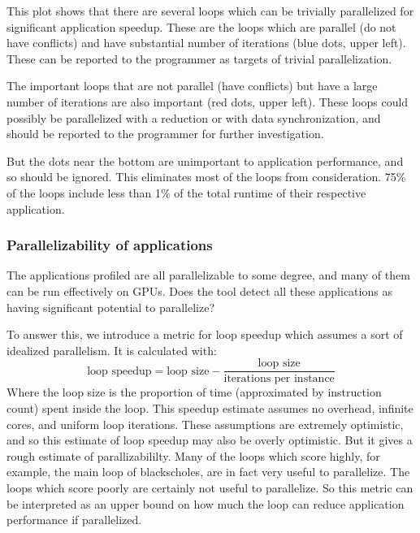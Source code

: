 \documentclass[12pt,twoside]{reedthesis}
\begin{document}
		This plot shows that there are several loops which can be trivially parallelized for significant application speedup. 
		These are the loops which are parallel (do not have conflicts) and have substantial number of iterations (blue dots, upper left). These can be reported to the programmer as targets of trivial parallelization. 
		
		The important loops that are not parallel (have conflicts) but have a large number of iterations are also important (red dots, upper left). These loops could possibly be parallelized with a reduction or with data synchronization, and should be reported to the programmer for further investigation.
		
		But the dots near the bottom are unimportant to application performance, and so should be ignored. This eliminates most of the loops from consideration. 75\% of the loops include less than 1\% of the total runtime of their respective application. 
		
		
		
		\subsubsection{Parallelizability of applications}
		
		The applications profiled are all parallelizable to some degree, and many of them can be run effectively on GPUs. Does the tool detect all these applications as having significant potential to parallelize? 
		
		To answer this, we introduce a metric for loop speedup which assumes a sort of idealized parallelism. It is calculated with:
		$$\text{loop speedup} = \text{loop size} - \frac{\text{loop size}}{\text{iterations per instance}} $$
		Where the loop size is the proportion of time (approximated by instruction count) spent inside the loop.
		This speedup estimate assumes no overhead, infinite cores, and uniform loop iterations.
		These assumptions are extremely optimistic, and so this estimate of loop speedup may also be overly optimistic. But it gives a rough estimate of parallizabililty. Many of the loops which score highly, for example, the main loop of blackscholes, are in fact very useful to parallelize. The loops which score poorly are certainly not useful to parallelize. 
		So this metric can be interpreted as an upper bound on how much the loop can reduce application performance if parallelized. 
		
\end{document}
